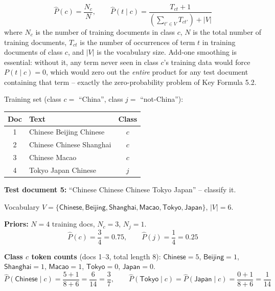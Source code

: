 \documentclass[11pt, a4paper]{article}
\begin{document}
\begin{formulabox}
\[
\hat P(c) = \frac{N_c}{N}, \qquad
\hat P(t\mid c) = \frac{T_{ct}+1}{\left(\sum_{t'\in V} T_{ct'}\right) + |V|}
\]
where $N_c$ is the number of training documents in class $c$, $N$ is the total number of training documents, $T_{ct}$ is the number of occurrences of term $t$ in training documents of class $c$, and $|V|$ is the vocabulary size. Add-one smoothing is essential: without it, any term never seen in class $c$'s training data would force $P(t\mid c)=0$, which would zero out the \emph{entire} product for any test document containing that term -- exactly the zero-probability problem of Key Formula 5.2.
\end{formulabox}

\begin{examplebox}
Training set (class $c=$ ``China'', class $j=$ ``not-China''):

\begin{center}
\begin{tabular}{@{}clc@{}}
\toprule
Doc & Text & Class \\
\midrule
1 & Chinese Beijing Chinese & $c$ \\
2 & Chinese Chinese Shanghai & $c$ \\
3 & Chinese Macao & $c$ \\
4 & Tokyo Japan Chinese & $j$ \\
\bottomrule
\end{tabular}
\end{center}

\textbf{Test document 5:} ``Chinese Chinese Chinese Tokyo Japan'' -- classify it.

Vocabulary $V=\{\textsf{Chinese},\textsf{Beijing},\textsf{Shanghai},\textsf{Macao},\textsf{Tokyo},\textsf{Japan}\}$, $|V|=6$.

\textbf{Priors:} $N=4$ training docs, $N_c=3$, $N_j=1$.
\[
\hat P(c) = \frac34 = 0.75, \qquad \hat P(j) = \frac14 = 0.25
\]

\textbf{Class $c$ token counts} (docs 1--3, total length $8$): $\textsf{Chinese}=5$, $\textsf{Beijing}=1$, $\textsf{Shanghai}=1$, $\textsf{Macao}=1$, $\textsf{Tokyo}=0$, $\textsf{Japan}=0$.
\[
\hat P(\textsf{Chinese}\mid c) = \frac{5+1}{8+6} = \frac{6}{14} = \frac37, \qquad
\hat P(\textsf{Tokyo}\mid c) = \hat P(\textsf{Japan}\mid c) = \frac{0+1}{8+6}=\frac{1}{14}
\]


\end{examplebox}
\end{document}
